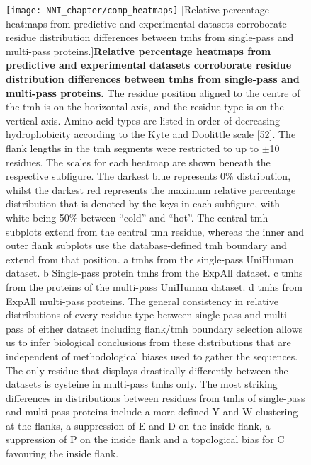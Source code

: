 \begin{figure}[p]
\centering
\texttt{[image: NNI\_chapter/comp\_heatmaps]}
[Relative percentage heatmaps from predictive and experimental datasets corroborate residue distribution differences between \gls{tmh}s from single-pass and multi-pass proteins.]{\textbf{Relative percentage heatmaps from predictive and experimental datasets corroborate residue distribution differences between \gls{tmh}s from single-pass and multi-pass proteins.}
The residue position aligned to the centre of the \gls{tmh} is on the horizontal axis, and the residue type is on the vertical axis.
Amino acid types are listed in order of decreasing hydrophobicity according to the Kyte and Doolittle scale [52].
The flank lengths in the \gls{tmh} segments were restricted to up to $\pm$10 residues.
The scales for each heatmap are shown beneath the respective subfigure.
The darkest blue represents 0\% distribution, whilst the darkest red represents the maximum relative percentage distribution that is denoted by the keys in each subfigure, with white being 50\% between ``cold'' and ``hot''.
The central \gls{tmh} subplots extend from the central \gls{tmh} residue, whereas the inner and outer flank subplots use the database-defined \gls{tmh} boundary and extend from that position.
a \gls{tmh}s from the single-pass UniHuman dataset.
b Single-pass protein \gls{tmh}s from the ExpAll dataset.
c \gls{tmh}s from the proteins of the multi-pass UniHuman dataset.
d \gls{tmh}s from ExpAll multi-pass proteins.
The general consistency in relative distributions of every residue type between single-pass and multi-pass of either dataset including flank/\gls{tmh} boundary selection allows us to infer biological conclusions from these distributions that are independent of methodological biases used to gather the sequences.
The only residue that displays drastically differently between the datasets is cysteine in multi-pass \gls{tmh}s only.
The most striking differences in distributions between residues from \gls{tmh}s of single-pass and multi-pass proteins include a more defined Y and W clustering at the flanks, a suppression of E and D on the inside flank, a suppression of P on the inside flank and a topological bias for C favouring the inside flank.}

\label{fig:comp_heatmaps}
\end{figure}

